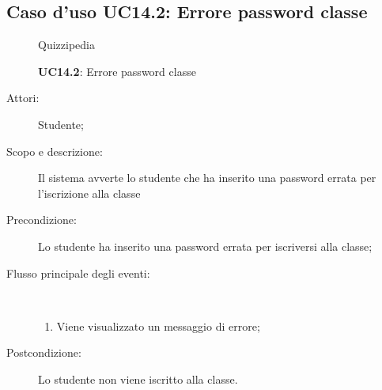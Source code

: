 \subsection{Caso d'uso UC14.2: Errore password classe}
	\begin{figure}[H]
		\centering
		\begin{resizedtikzpicture}{\textwidth}
		\begin{umlsystem}[x=0, fill=lightgray!20]{Quizzipedia}
		\end{umlsystem}
		\end{resizedtikzpicture}
		\caption{\textbf{UC14.2}: Errore password classe}
		\label{UC14.2}
	\end{figure}
\begin{description}
\item[Attori:] Studente;
\item[Scopo e descrizione:] Il sistema avverte lo studente che ha inserito una password errata per l'iscrizione alla classe
      \item[Precondizione:] Lo studente ha inserito una password errata per iscriversi alla classe;

        \item[Flusso principale degli eventi:] \ 
 \begin{enumerate}
          \item Viene visualizzato un messaggio di errore;

      \end{enumerate}
    \item[Postcondizione:] Lo studente non viene iscritto alla classe.
  \end{description}
\hypertarget{UC15}{}
